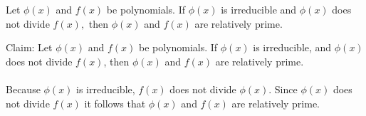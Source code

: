 Let $\phi(x)$ and $f(x)$ be polynomials. If $\phi(x)$ is irreducible
and $\phi(x)$ does not divide $f(x),$ then $\phi(x)$ and $f(x)$ are
relatively prime.

Claim: Let $\phi(x)$ and $f(x)$ be polynomials. If $\phi(x)$ is
irreducible, and $\phi(x)$ does not divide $f(x)$, then $\phi(x)$ and
$f(x)$ are relatively prime.

\paragraph{}
Because $\phi(x)$ is irreducible, $f(x)$ does not divide
$\phi(x)$. Since $\phi(x)$ does not divide $f(x)$ it follows that
$\phi(x)$ and $f(x)$ are relatively prime.
